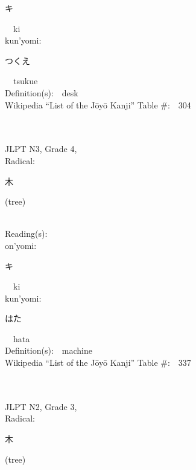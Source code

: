 \begin{multicols}{2}
{\hspace*{2em}}{\begin{CJK}{UTF8}{min} キ \end{CJK}}\ \ ki\ \ \\
{\hspace*{1em}}kun'yomi:\ \ \\
{\hspace*{2em}}{\begin{CJK}{UTF8}{min} つくえ \end{CJK}}\ \ tsukue\ \ \\
Definition(s):\ \ desk \\
Wikipedia ``List of the J\=oy\=o Kanji'' Table \#:\ \ 304 \\
\ \ \\
{\fontsize{34pt}{40pt}  }\ \ \\  %
{JLPT N3, Grade 4, \\Radical:\ \ {\begin{CJK}{UTF8}{min} 木 \end{CJK}} (tree) } \\
Reading(s):\ \ \\
{\hspace*{1em}}on'yomi:\ \ \\
{\hspace*{2em}}{\begin{CJK}{UTF8}{min} キ \end{CJK}}\ \ ki\ \ \\
{\hspace*{1em}}kun'yomi:\ \ \\
{\hspace*{2em}}{\begin{CJK}{UTF8}{min} はた \end{CJK}}\ \ hata\ \ \\
Definition(s):\ \ machine \\
Wikipedia ``List of the J\=oy\=o Kanji'' Table \#:\ \ 337 \\
\ \ \\
{\fontsize{34pt}{40pt}  }\ \ \\  %
{JLPT N2, Grade 3, \\Radical:\ \ {\begin{CJK}{UTF8}{min} 木 \end{CJK}} (tree) } \\

\end{multicols}
